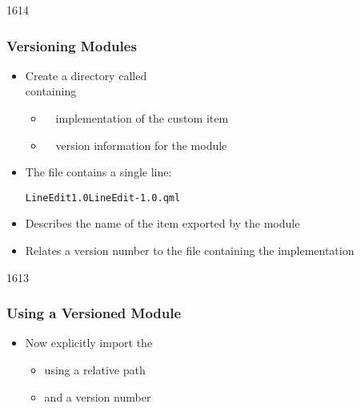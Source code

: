 \begin{slide}{1614}\frametitle{Versioning Modules}


\begin{itemize}
\item Create a directory called \\
      containing
  \begin{itemize}
  \item {}~\textendash~implementation of the custom item
  \item {}~\textendash~version information for the module
  \end{itemize}

\item The  file contains a single line:

\begin{alltt}
LineEdit 1.0 LineEdit-1.0.qml
\end{alltt}

\item Describes the name of the item exported by the module
\item Relates a version number to the file containing the implementation
\end{itemize}

\end{slide}


\begin{slide}{1613}\frametitle{Using a Versioned Module}


\vspace*{0.5em}
\begin{itemize}
\item Now explicitly import the 
  \begin{itemize}
  \item using a relative path
  \item and a version number
  \end{itemize}
\end{itemize}



\end{slide}

